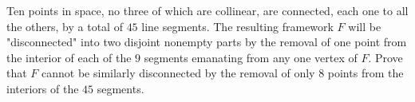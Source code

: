 Ten points in space, no three of which are collinear, are connected, each one
to all the others, by a total of $45$ line segments. The resulting framework
$F$ will be "disconnected" into two disjoint nonempty parts by the removal of
one point from the interior of each of the $9$ segments emanating from any one
vertex of $F$. Prove that $F$ cannot be similarly disconnected by the removal
of only $8$ points from the interiors of the $45$ segments.
